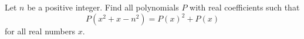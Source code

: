 Let $n$ be a positive integer. Find all polynomials $P$ with real coefficients such that
$$P(x^2+x-n^2) = P(x)^2+P(x)$$
for all real numbers $x$.
